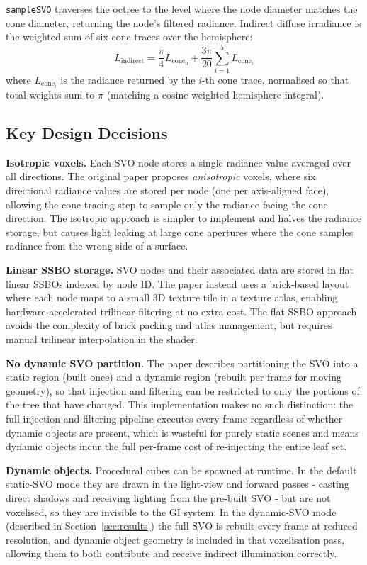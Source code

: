 \documentclass[12pt]{article}
\begin{document}
\texttt{sampleSVO} traverses the octree to the level where the node diameter matches the cone diameter, returning the node's filtered radiance. Indirect diffuse irradiance is the weighted sum of six cone traces over the hemisphere:
\[
    L_\text{indirect} = \frac{\pi}{4} L_{\text{cone}_0} + \frac{3\pi}{20}\sum_{i=1}^{5} L_{\text{cone}_i}
\]
where $L_{\text{cone}_i}$ is the radiance returned by the $i$-th cone trace, normalised so that total weights sum to $\pi$ (matching a cosine-weighted hemisphere integral).

\subsection{Key Design Decisions}

\textbf{Isotropic voxels.} Each SVO node stores a single radiance value averaged over all directions. The original paper proposes \emph{anisotropic} voxels, where six directional radiance values are stored per node (one per axis-aligned face), allowing the cone-tracing step to sample only the radiance facing the cone direction. The isotropic approach is simpler to implement and halves the radiance storage, but causes light leaking at large cone apertures where the cone samples radiance from the wrong side of a surface.

\textbf{Linear SSBO storage.} SVO nodes and their associated data are stored in flat linear SSBOs indexed by node ID. The paper instead uses a brick-based layout where each node maps to a small 3D texture tile in a texture atlas, enabling hardware-accelerated trilinear filtering at no extra cost. The flat SSBO approach avoids the complexity of brick packing and atlas management, but requires manual trilinear interpolation in the shader.

\textbf{No dynamic SVO partition.} The paper describes partitioning the SVO into a static region (built once) and a dynamic region (rebuilt per frame for moving geometry), so that injection and filtering can be restricted to only the portions of the tree that have changed. This implementation makes no such distinction: the full injection and filtering pipeline executes every frame regardless of whether dynamic objects are present, which is wasteful for purely static scenes and means dynamic objects incur the full per-frame cost of re-injecting the entire leaf set.

\textbf{Dynamic objects.} Procedural cubes can be spawned at runtime. In the default static-SVO mode they are drawn in the light-view and forward passes - casting direct shadows and receiving lighting from the pre-built SVO - but are not voxelised, so they are invisible to the GI system. In the dynamic-SVO mode (described in Section~\ref{sec:results}) the full SVO is rebuilt every frame at reduced resolution, and dynamic object geometry is included in that voxelisation pass, allowing them to both contribute and receive indirect illumination correctly.
\end{document}
